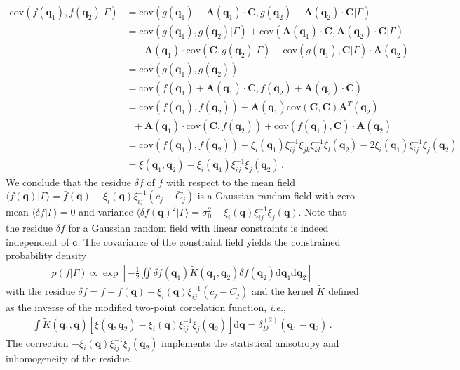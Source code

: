 \documentclass[a4paper, 11pt]{article}
\begin{document}
\begin{align}
\text{cov}(f(\bm{q}_1), f(\bm{q}_2)|\Gamma) 
&= \text{cov}(g(\bm{q}_1) - \bm{A}(\bm{q}_1)\cdot \bm{C}, g(\bm{q}_2) - \bm{A}(\bm{q}_2)\cdot \bm{C}|\Gamma) \nonumber\\
&= \text{cov}(g(\bm{q}_1), g(\bm{q}_2)|\Gamma) + \text{cov}(\bm{A}(\bm{q}_1)\cdot \bm{C}, \bm{A}(\bm{q}_2)\cdot \bm{C}|\Gamma)\nonumber\\
&\ \ \  - \bm{A}(\bm{q}_1)\cdot \text{cov}(\bm{C}, g(\bm{q}_2)|\Gamma) -\text{cov}(g(\bm{q}_1) , \bm{C}|\Gamma)\cdot \bm{A}(\bm{q}_2)\nonumber\\
&= \text{cov}(g(\bm{q}_1), g(\bm{q}_2)) \nonumber\\
&=\text{cov}(f(\bm{q}_1) + \bm{A}(\bm{q}_1)\cdot \bm{C}, f(\bm{q}_2) + \bm{A}(\bm{q}_2)\cdot \bm{C})\nonumber\\
&=\text{cov}(f(\bm{q}_1), f(\bm{q}_2)) + \bm{A}(\bm{q}_1) \text{cov}(\bm{C},\bm{C}) \bm{A}^T(\bm{q}_2) \nonumber\\
&\ \ \ + \bm{A}(\bm{q}_1) \cdot \text{cov}(\bm{C},f(\bm{q}_2))+ \text{cov}(f(\bm{q}_1), \bm{C}) \cdot \bm{A}(\bm{q}_2) \nonumber\\
&=\text{cov}(f(\bm{q}_1), f(\bm{q}_2)) + \xi_i(\bm{q}_1)\xi_{ij}^{-1}\xi_{jk}\xi_{kl}^{-1}\xi_{l}(\bm{q}_2) - 2\xi_i(\bm{q}_1)\xi_{ij}^{-1}\xi_{j}(\bm{q}_2)\nonumber\\
&=\xi(\bm{q}_1,\bm{q}_2) - \xi_i(\bm{q}_1) \xi_{ij}^{-1} \xi_j(\bm{q}_2)\,.
\end{align}
We conclude that the residue $\delta f$ of $f$ with respect to the mean field $\langle f(\bm{q})|\Gamma\rangle =\bar{f}(\bm{q})+ \xi_i(\bm{q})\xi_{ij}^{-1}(c_j-\bar{C}_j)$ is a Gaussian random field with zero mean $\langle \delta f|\Gamma\rangle=0$ and variance $\langle \delta f(\bm{q})^2|\Gamma\rangle = \sigma_0^2 - \xi_i(\bm{q}) \xi_{ij}^{-1} \xi_j(\bm{q})$. Note that the residue $\delta f$ for a Gaussian random field with linear constraints is indeed independent of $\bm{c}$. The covariance of the constraint field yields the constrained probability density
\begin{align}
p(f|\Gamma) \propto  \exp\left[-\frac{1}{2} \iint \delta{f}(\bm{q}_1) \tilde{K}(\bm{q}_1,\bm{q}_2) \delta f(\bm{q}_2)\mathrm{d}\bm{q}_1 \mathrm{d}\bm{q}_2 \right]
\end{align}
with the residue $\delta f = f-\bar{f}(\bm{q})+ \xi_i(\bm{q})\xi_{ij}^{-1}(c_j-\bar{C}_j)$ and the kernel $\tilde{K}$ defined as the inverse of the modified two-point correlation function, \textit{i.e.},
\begin{align}
\int \tilde{K}(\bm{q}_1,\bm{q}) \left[\xi(\bm{q},\bm{q}_2) - \xi_i(\bm{q})\xi_{ij}^{-1}\xi_j(\bm{q}_2)\right]\mathrm{d}\bm{q}= \delta_D^{(2)}(\bm{q}_1-\bm{q}_2)\,.
\end{align}
The correction $- \xi_i(\bm{q})\xi_{ij}^{-1}\xi_j(\bm{q}_2)$ implements the statistical anisotropy and inhomogeneity of the residue.
\end{document}
